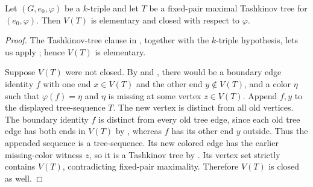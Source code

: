 \begin{lemma}
Let $(G,e_0,\varphi)$ be a $k$-triple and let $T$ be a fixed-pair maximal
Tashkinov tree for $(e_0,\varphi)$.  Then $V(T)$ is elementary and closed
with respect to $\varphi$.
\end{lemma}
\begin{proof}
The Tashkinov-tree clause in
, together with the $k$-triple
hypothesis, lets us apply ; hence $V(T)$ is elementary.

Suppose $V(T)$ were not closed.  By  and
, there would be a boundary edge identity $f$ with
one end $x\in V(T)$ and the other end $y\notin V(T)$, and a color $\eta$
such that $\varphi(f)=\eta$ and $\eta$ is missing at some vertex
$z\in V(T)$.  Append $f,y$ to the displayed tree-sequence $T$.  The new
vertex is distinct from all old vertices.  The boundary identity $f$ is
distinct from every old tree edge, since each old tree edge has both ends
in $V(T)$ by , whereas $f$ has its other end $y$
outside.  Thus the appended sequence is a tree-sequence.  Its new colored
edge has the earlier missing-color witness $z$, so it is a Tashkinov tree
by .  Its vertex set strictly contains $V(T)$,
contradicting fixed-pair maximality.  Therefore $V(T)$ is closed as well.
\end{proof}
